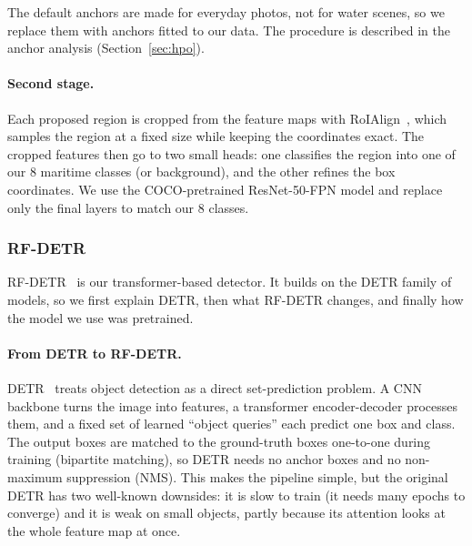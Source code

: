\documentclass[11pt,a4paper]{article}
\begin{document}
The default anchors are made for everyday photos, not for water scenes, so we
replace them with anchors fitted to our data. The procedure is described in the
anchor analysis (Section~\ref{sec:hpo}).

\paragraph{Second stage.}
Each proposed region is cropped from the feature maps with RoIAlign~\cite{he2017mask},
which samples the region at a fixed size while keeping the coordinates exact. The
cropped features then go to two small heads: one classifies the region into one
of our 8 maritime classes (or background), and the other refines the box
coordinates. We use the COCO-pretrained ResNet-50-FPN model and replace only the
final layers to match our 8 classes.



\subsubsection{RF-DETR}
RF-DETR~\cite{rfdetr2025} is our transformer-based detector. It builds on the
DETR family of models, so we first explain DETR, then what RF-DETR changes, and
finally how the model we use was pretrained.

\paragraph{From DETR to RF-DETR.}
DETR~\cite{carion2020detr} treats object detection as a direct set-prediction
problem. A CNN backbone turns the image into features, a transformer
encoder-decoder processes them, and a fixed set of learned ``object queries''
each predict one box and class. The output boxes are matched to the ground-truth
boxes one-to-one during training (bipartite matching), so DETR needs no anchor
boxes and no non-maximum suppression (NMS). This makes the pipeline simple, but
the original DETR has two well-known downsides: it is slow to train (it needs
many epochs to converge) and it is weak on small objects, partly because its
attention looks at the whole feature map at once.
\end{document}
